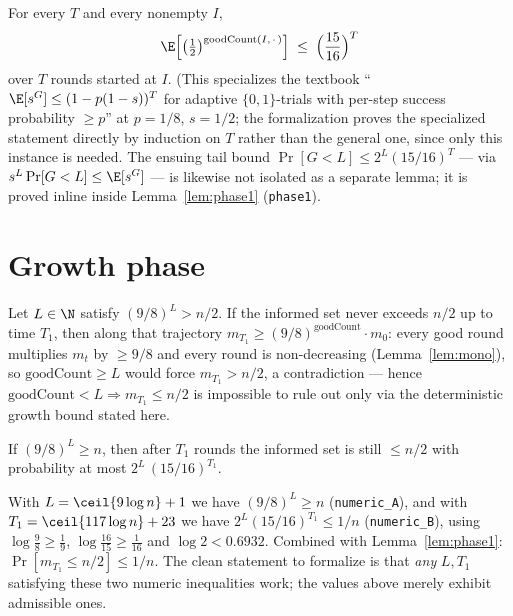 \begin{lemma}\label{lem:adaptive}
  \leanok
  For every $T$ and every nonempty $I$,
  \[
    \E\Bigl[\bigl(\tfrac12\bigr)^{\mathrm{goodCount}(I,\,\cdot\,)}\Bigr]
      \;\le\; \Bigl(\frac{15}{16}\Bigr)^{T}
  \]
  over $T$ rounds started at $I$. (This specializes the textbook
  ``$\E[s^G] \le (1-p(1-s))^T$ for adaptive $\{0,1\}$-trials with
  per-step success probability $\ge p$'' at $p = 1/8$, $s = 1/2$; the
  formalization proves the specialized statement directly by induction on
  $T$ rather than the general one, since only this instance is needed. The
  ensuing tail bound $\Pr[G < L] \le 2^{L}(15/16)^{T}$ — via
  $s^{L}\Pr[G<L] \le \E[s^G]$ — is likewise not isolated as a separate
  lemma; it is proved inline inside Lemma~\ref{lem:phase1}
  (\texttt{phase1}).
\end{lemma}

\section{Growth phase}\label{sec:growth}

\begin{lemma}\label{lem:force}
  \leanok
  Let $L \in \N$ satisfy $(9/8)^L > n/2$. If the informed set never exceeds
  $n/2$ up to time $T_1$, then along that trajectory
  $m_{T_1} \ge (9/8)^{\mathrm{goodCount}} \cdot m_0$: every good round
  multiplies $m_t$ by $\ge 9/8$ and every round is non-decreasing
  (Lemma~\ref{lem:mono}), so $\mathrm{goodCount} \ge L$ would force
  $m_{T_1} > n/2$, a contradiction — hence
  $\mathrm{goodCount} < L \Rightarrow m_{T_1} \le n/2$ is impossible to rule
  out only via the deterministic growth bound stated here.
\end{lemma}

\begin{lemma}[Phase 1]\label{lem:phase1}
  \leanok
  If $(9/8)^L \ge n$, then after $T_1$ rounds the informed set is still
  $\le n/2$ with probability at most $2^{L}\,(15/16)^{T_1}$.
\end{lemma}

\begin{lemma}\label{lem:constants}
  \leanok
  With $L = \ceil{9 \log n} + 1$ we have $(9/8)^L \ge n$
  (\texttt{numeric\_A}), and with $T_1 = \ceil{117 \log n} + 23$ we have
  $2^{L}(15/16)^{T_1} \le 1/n$ (\texttt{numeric\_B}), using
  $\log\tfrac98 \ge \tfrac19$, $\log\tfrac{16}{15} \ge \tfrac1{16}$ and
  $\log 2 < 0.6932$. Combined with Lemma~\ref{lem:phase1}:
  $\Pr[m_{T_1} \le n/2] \le 1/n$. The clean statement to formalize is that
  \emph{any} $L, T_1$ satisfying these two numeric inequalities work; the
  values above merely exhibit admissible ones.
\end{lemma}

